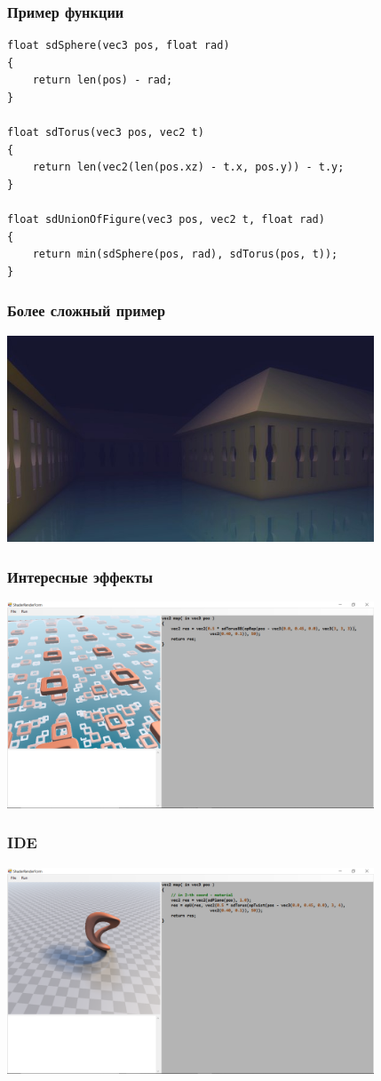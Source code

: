 \documentclass{beamer}
\begin{document}
\lstset{language=c++}
\begin{frame}[fragile]\frametitle{Пример функции}
\begin{lstlisting}
float sdSphere(vec3 pos, float rad)
{
    return len(pos) - rad;
}

float sdTorus(vec3 pos, vec2 t)
{
    return len(vec2(len(pos.xz) - t.x, pos.y)) - t.y;
}

float sdUnionOfFigure(vec3 pos, vec2 t, float rad)
{
    return min(sdSphere(pos, rad), sdTorus(pos, t));
}
\end{lstlisting}
\end{frame}

\begin{frame}[fragile]\frametitle{Более сложный пример}
\includegraphics[width = 310pt]{house.jpg}
\end{frame}

\begin{frame}[fragile]\frametitle{Интересные эффекты}
\includegraphics[width = 310pt]{replace.png}
\end{frame}

\begin{frame}[fragile]\frametitle{IDE}
\includegraphics[width = 310pt]{prim1.png}
\end{frame}
\end{document}
